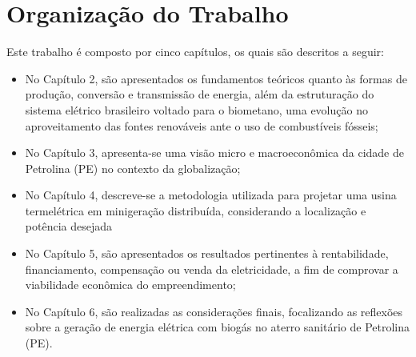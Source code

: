\section{Organização do Trabalho}
Este trabalho é composto por cinco capítulos, os quais são descritos a seguir:

\begin{itemize}
    \item No Capítulo 2, são apresentados os fundamentos teóricos quanto às formas de produção, conversão e transmissão de energia, além da estruturação do sistema elétrico brasileiro voltado para o biometano, uma evolução no aproveitamento das fontes renováveis ante o uso de combustíveis fósseis;
    \item No Capítulo 3, apresenta-se uma visão micro e macroeconômica da cidade de Petrolina (PE) no contexto da globalização;
    \item No Capítulo 4, descreve-se a metodologia utilizada para projetar uma usina termelétrica em minigeração distribuída, considerando a localização e potência desejada
    \item No Capítulo 5, são apresentados os resultados pertinentes à rentabilidade, financiamento, compensação ou venda da eletricidade, a fim de comprovar a viabilidade econômica do empreendimento;
    \item No Capítulo 6, são realizadas as considerações finais, focalizando as reflexões sobre a geração de energia elétrica com biogás no aterro sanitário de Petrolina (PE).
\end{itemize}
